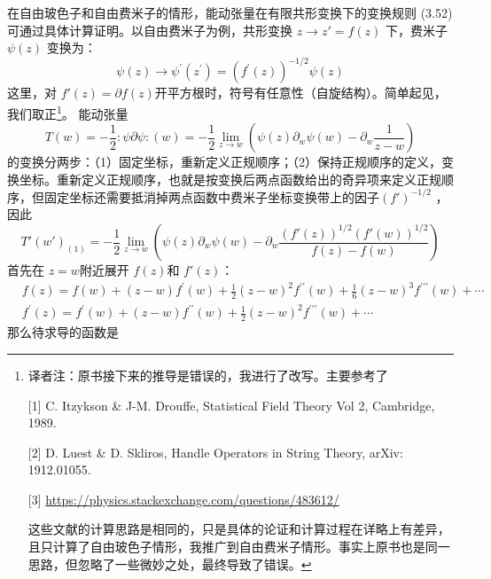 在自由玻色子和自由费米子的情形，能动张量在有限共形变换下的变换规则 (3.52) 可通过具体计算证明。以自由费米子为例，共形变换 $z\to z'=f(z)$ 下，费米子 $\psi(z)$ 变换为：
\begin{equation}
	\psi(z) \rightarrow \psi^{\prime}\left(z^{\prime}\right)=\left(f^{\prime}(z)\right)^{-1 / 2} \psi(z)
\end{equation}
这里，对 $f'(z)=\partial f(z) $开平方根时，符号有任意性（自旋结构）。简单起见，我们取正\footnote{译者注：原书接下来的推导是错误的，我进行了改写。主要参考了
	
	[1] C. Itzykson \& J-M. Drouffe, Statistical Field Theory Vol 2, Cambridge, 1989.
	
	[2] D. Luest \& D. Skliros, Handle Operators in String Theory, arXiv: 1912.01055.
	
	[3] \url{https://physics.stackexchange.com/questions/483612/}
	
	这些文献的计算思路是相同的，只是具体的论证和计算过程在详略上有差异，且只计算了自由玻色子情形，我推广到自由费米子情形。事实上原书也是同一思路，但忽略了一些微妙之处，最终导致了错误。}。
能动张量
\begin{equation}
	T\left(w\right)=-\frac{1}{2} :\psi \partial \psi:(w)=-\frac{1}{2}\lim _{z \rightarrow w}\left(\psi\left(z\right) \partial_{w} \psi\left(w\right)-\partial_w\frac{1}{z-w}\right)
\end{equation}
的变换分两步：（1）固定坐标，重新定义正规顺序；（2）保持正规顺序的定义，变换坐标。重新定义正规顺序，也就是按变换后两点函数给出的奇异项来定义正规顺序，但固定坐标还需要抵消掉两点函数中费米子坐标变换带上的因子$ (f')^{-1/2}$ ，因此
\begin{equation}
	T'(w')_{(1)}=-\frac{1}{2}\lim _{z \rightarrow w}\left(\psi\left(z\right) \partial_{w} \psi\left(w\right)-\partial_w\frac{(f'(z))^{1/2}(f'(w))^{1/2}}{f(z)-f(w)}\right)
\end{equation}
首先在 $z=w $附近展开 $f(z) $和 $f'(z) $：
\begin{equation*}
	\begin{aligned} &f(z)=f(w)+(z-w) f^{\prime}(w)+\frac{1}{2}(z-w)^{2} f^{\prime \prime}(w)+\frac{1}{6}(z-w)^{3} f^{\prime \prime \prime}(w)+\cdots \\ &f^{\prime}(z)=f^{\prime}(w)+(z-w) f^{\prime \prime}(w)+\frac{1}{2}(z-w)^{2} f^{\prime \prime \prime}(w)+\cdots \end{aligned}
\end{equation*}
那么待求导的函数是
